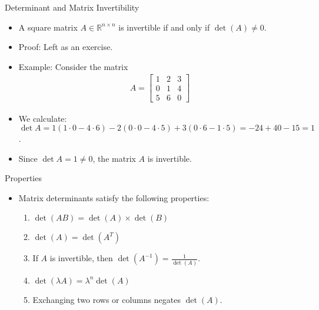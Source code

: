 \begin{frame}{Determinant and Matrix Invertibility}
\begin{itemize}
    \item A square matrix $A\in \mathbb{R}^{n\times n}$ is invertible if and only if $\det(A) \neq 0$.
    \item Proof: Left as an exercise.
    \item Example: Consider the matrix 
    \begin{align}
       A=\begin{bmatrix} 1 & 2 & 3 \\ 0 & 1 & 4 \\ 5 & 6 & 0 \end{bmatrix}
    \end{align}
    \item We calculate: $\det A = 1(1 \cdot 0 - 4 \cdot 6) - 2(0 \cdot 0 - 4 \cdot 5) + 3(0 \cdot 6 - 1 \cdot 5) = -24 + 40 - 15 = 1$.
    \item Since $\det A = 1 \neq 0$, the matrix $A$ is invertible.
\end{itemize}
\end{frame}


\begin{frame}{Properties}
\begin{itemize}
    \item Matrix determinants satisfy the following properties:
    \begin{enumerate}
        \item $\det(AB) = \det(A) \times \det (B)$
        \item  $\det(A) = \det(A^T)$
        \item If $A$ is invertible, then  $\det(A^{-1}) = \frac{1}{\det (A)}$.
        \item $\det (\lambda A ) = \lambda^n \det (A)$
        \item Exchanging two rows or columns negates $\det(A)$.
    \end{enumerate}
\end{itemize}
\end{frame}

